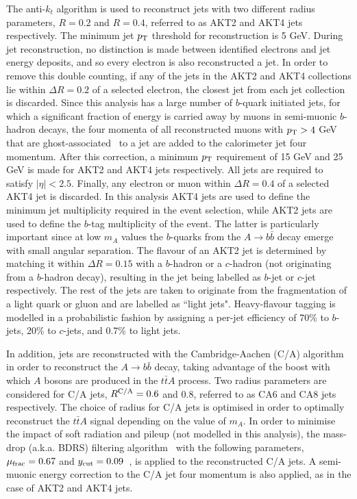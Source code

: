 \documentclass[preprintnumbers,superscriptaddress,nofootinbib,aps,prd,floatfix]{revtex4}
\newcommand{\pt}{p_{\rm{T}}}
\newcommand{\ttbar}{\ensuremath{t\bar{t}}}
\begin{document}
The anti-$k_t$ algorithm is used to reconstruct jets with two different radius parameters, $R=0.2$ and $R=0.4$, referred
to as AKT2 and AKT4 jets respectively. The minimum jet $\pt$ threshold for reconstruction is 5 GeV. 
During jet reconstruction, no distinction is made between identified electrons and jet energy deposits, and
so every electron is also reconstructed a jet. In order to remove this double counting, if any of the jets in the AKT2 and AKT4 collections
lie within $\Delta R=0.2$ of a selected electron, the closest jet from each jet collection is discarded.
Since this analysis has a large number of $b$-quark initiated jets, for which a significant fraction of energy
is carried away by muons in semi-muonic $b$-hadron decays, the four momenta of all reconstructed muons 
with $\pt>4$ GeV that are ghost-associated~\cite{Cacciari:2007fd,Cacciari:2008gn} to a jet are added to the calorimeter jet four momentum.
After this correction, a minimum $\pt$ requirement of 15 GeV and 25 GeV is made
for AKT2 and AKT4 jets respectively. All jets are required to satisfy $|\eta|<2.5$. 
Finally, any electron or muon within $\Delta R=0.4$ of a selected AKT4 jet is discarded.
In this analysis AKT4 jets are used to define the minimum jet multiplicity required in the event selection, while 
AKT2 jets are used to define the $b$-tag multiplicity of the event. The latter is particularly important since 
at low $m_A$ values the $b$-quarks from the $A \to b\bar{b}$ decay emerge with small angular separation.
The flavour of an AKT2 jet is determined by matching it within $\Delta R=0.15$ with a $b$-hadron or 
a $c$-hadron (not originating from a $b$-hadron decay), resulting in the jet being labelled as $b$-jet or $c$-jet respectively. 
The rest of the jets are taken to originate from the fragmentation of a light quark or gluon and are labelled 
as ``light jets". Heavy-flavour tagging is modelled in a probabilistic fashion by assigning a per-jet efficiency of 
70\% to $b$-jets, 20\% to $c$-jets, and 0.7\% to light jets.

In addition, jets are reconstructed with the Cambridge-Aachen (C/A) algorithm~\cite{Dokshitzer:1997in,Wobisch:1998wt} 
in order to reconstruct the $A \to b\bar{b}$ decay, taking advantage of the boost with which $A$ bosons are produced in the
$\ttbar A$ process. Two radius parameters are considered for C/A jets, $R^{\rm C/A}=0.6$ and 0.8, referred to as CA6 and CA8 jets 
respectively. The choice of radius for C/A jets is optimised in order to optimally
reconstruct the $\ttbar A$ signal depending on the value of $m_A$. In order to minimise the impact of
soft radiation and pileup (not modelled in this analysis), the mass-drop (a.k.a. BDRS) filtering algorithm~\cite{Butterworth:2008iy, Plehn:2009rk} 
with the following parameters, $\mu_{\rm frac}=0.67$ and $y_{\rm cut}=0.09$~\cite{Aad:2013gja}, is applied to the
reconstructed C/A jets. A semi-muonic energy correction to the C/A jet four momentum is also applied, as in the case of AKT2 and AKT4 jets.
\end{document}
